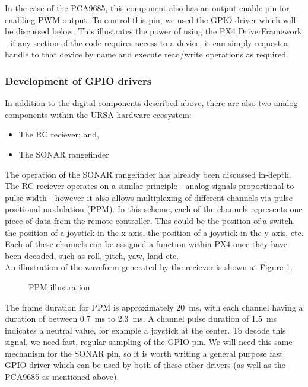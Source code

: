 \documentclass[capstone_report.tex]{subfiles}
\begin{document}
    In the case of the PCA9685, this component also has an output enable pin for enabling PWM output. To control this pin, we used the GPIO driver which will be discussed below. This illustrates the power of using the PX4 DriverFramework - if any section of the code requires access to a device, it can simply request a handle to that device by name and execute read/write operations as required.

    \subsubsection{Development of GPIO drivers}
    In addition to the digital components described above, there are also two analog components within the URSA hardware ecosystem:
    \begin{itemize}
        \item The RC reciever; and,
        \item The SONAR rangefinder 
    \end{itemize}

    The operation of the SONAR rangefinder has already been discussed in-depth. The RC reciever operates on a similar principle - analog signals proportional to pulse width - however it also allows multiplexing of different channels via pulse positional modulation (PPM). In this scheme, each of the channels represents one piece of data from the remote controller. This could be the position of a switch, the position of a joystick in the x-axis, the position of a joystick in the y-axis, etc. Each of these channels can be assigned a function within PX4 once they have been decoded, such as roll, pitch, yaw, land etc.\\

    An illustration of the waveform generated by the reciever is shown at Figure \ref{fig:ppm}.

    \begin{figure}[H]
    \centering
        
        \caption{PPM illustration\label{fig:ppm}}
    \end{figure}

    The frame duration for PPM is approximately \SI{20}{\milli\second}, with each channel having a duration of between \SI{0.7}{\milli\second} to \SI{2.3}{\milli\second}. A channel pulse duration of \SI{1.5}{\milli\second} indicates a neutral value, for example a joystick at the center. To decode this signal, we need fast, regular sampling of the GPIO pin. We will need this same mechanism for the SONAR pin, so it is worth writing a general purpose fast GPIO driver which can be used by both of these other drivers (as well as the PCA9685 as mentioned above).\\
\end{document}
